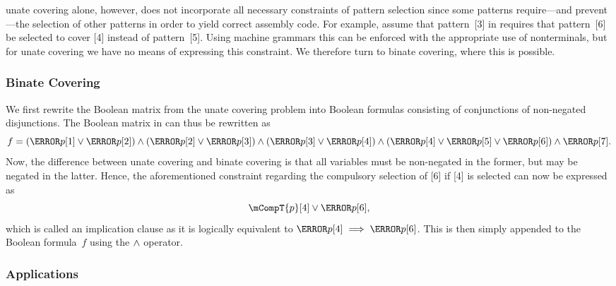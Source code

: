 \Gls{unate covering} alone, however, does not incorporate all necessary
constraints of \gls{pattern selection} since some \glspl{pattern} require---and
prevent---the selection of other \glspl{pattern} in order to yield correct
\gls{assembly code}.
%
For example, assume that \gls{pattern}~[3] in
 requires that
\gls{pattern}~[6] be selected to cover [4] instead of
\gls{pattern}~[5].
%
Using \glspl{machine grammar} this can be enforced with the appropriate use of
\glspl{nonterminal}, but for \gls{unate covering} we have no means of expressing
this constraint.
%
We therefore turn to
\gls{binate covering}, where this is possible.


\subsubsection{Binate Covering}

We first rewrite the Boolean matrix from the \gls{unate covering} problem into
Boolean formulas consisting of conjunctions of non-negated disjunctions.
%
The
Boolean matrix in  can thus be
rewritten as
\begin{displaymath}
  f =
  (\mT{p}[1] \mOr \mT{p}[2]) \mAnd (\mT{p}[2] \mOr \mT{p}[3]) \mAnd
  (\mT{p}[3] \mOr \mT{p}[4]) \mAnd (\mT{p}[4] \mOr \mT{p}[5] \mOr \mT{p}[6])
  \mAnd \mT{p}[7].
\end{displaymath}
Now, the difference between \gls{unate covering} and \gls{binate covering} is
that all variables must be non-negated in the former, but may be negated in the
latter.
%
Hence, the aforementioned constraint regarding the compulsory selection
of [6] if [4] is selected can now be expressed as
\begin{displaymath}
  \mCompT{p}[4] \mOr \mT{p}[6],
\end{displaymath}
which is called an \gls{implication clause} as it is logically equivalent to
\mbox{$\mT{p}[4] \implies \mT{p}[6]$}.
%
This is then simply appended to the
Boolean formula~$f$ using the $\wedge$ operator.


\subsubsection{Applications}

